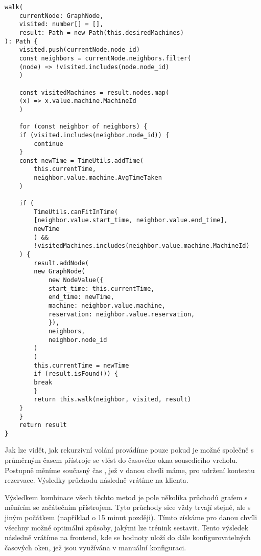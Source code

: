 \begin{lstlisting}
walk(
    currentNode: GraphNode,
    visited: number[] = [],
    result: Path = new Path(this.desiredMachines)
): Path {
    visited.push(currentNode.node_id)
    const neighbors = currentNode.neighbors.filter(
	(node) => !visited.includes(node.node_id)
    )

    const visitedMachines = result.nodes.map(
	(x) => x.value.machine.MachineId
    )

    for (const neighbor of neighbors) {
	if (visited.includes(neighbor.node_id)) {
	    continue
	}
	const newTime = TimeUtils.addTime(
	    this.currentTime,
	    neighbor.value.machine.AvgTimeTaken
	)

	if (
	    TimeUtils.canFitInTime(
		[neighbor.value.start_time, neighbor.value.end_time],
		newTime
	    ) &&
	    !visitedMachines.includes(neighbor.value.machine.MachineId)
	) {
	    result.addNode(
		new GraphNode(
		    new NodeValue({
			start_time: this.currentTime,
			end_time: newTime,
			machine: neighbor.value.machine,
			reservation: neighbor.value.reservation,
		    }),
		    neighbors,
		    neighbor.node_id
		)
	    )
	    this.currentTime = newTime
	    if (result.isFound()) {
		break
	    }
	    return this.walk(neighbor, visited, result)
	}
    }
    return result
}
\end{lstlisting}

Jak lze vidět, jak rekurzivní volání provádíme pouze pokud je možné společně s průměrným časem přístroje se vlést do časového okna sousedícího vrcholu. Postupně měníme současný čas , jež v danou chvíli máme, pro udržení kontextu rezervace. Výsledky průchodu následně vrátíme na klienta.

Výsledkem kombinace všech těchto metod je pole několika průchodů grafem s měnícím se začátečním přístrojem. Tyto průchody sice vždy trvají stejně, ale s jiným počátkem (například o 15 minut později). Tímto získáme pro danou chvíli všechny možné optimální způsoby, jakými lze trénink sestavit. Tento výsledek následně vrátíme na frontend, kde se hodnoty uloží do dále konfigurovatelných časových oken, jež jsou využívána v manuální konfiguraci.